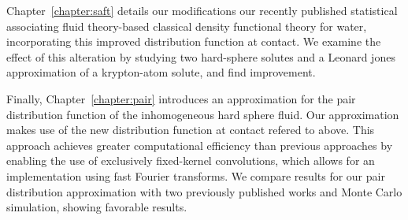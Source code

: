 Chapter~\ref{chapter:saft} details our modifications our recently
published statistical associating fluid theory-based classical density
functional theory for water, incorporating this improved distribution
function at contact.  We examine the effect of this alteration by
studying two hard-sphere solutes and a Leonard jones approximation of
a krypton-atom solute, and find improvement.
%

Finally, Chapter~\ref{chapter:pair} introduces an approximation for
the pair distribution function of the inhomogeneous hard sphere
fluid. Our approximation makes use of the new distribution function at
contact refered to above. This approach achieves greater computational
efficiency than previous approaches by enabling the use of exclusively
fixed-kernel convolutions, which allows for an implementation using
fast Fourier transforms. We compare results for our pair distribution
approximation with two previously published works and Monte Carlo
simulation, showing favorable results.




